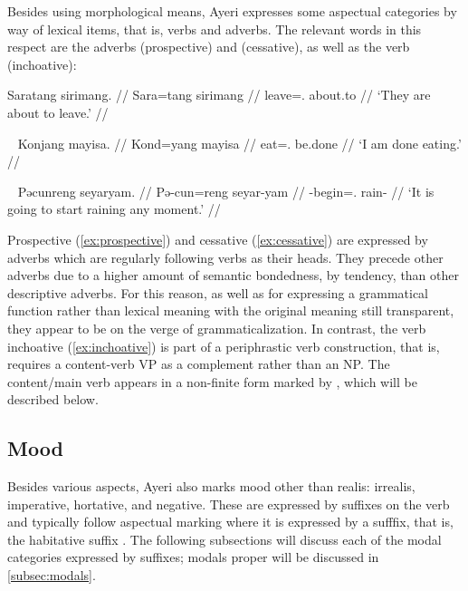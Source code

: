 Besides using morphological means, Ayeri expresses some aspectual categories by
way of lexical items, that is, verbs and adverbs. The relevant words in this
respect are the adverbs  (prospective) and
 (cessative), as well as 
the verb  (inchoative):

\ex\label{ex:prospective}\begingl
	\gla Saratang sirimang. //
	\glb Sara=tang sirimang //
	\glc leave=\TplM{}.\Aarg{} about.to //
	\glft `They are about to leave.' //
\endgl\xe

\ex~\label{ex:cessative}\begingl
	\gla Konjang mayisa. //
	\glb Kond=yang mayisa //
	\glc eat=\Fsg.\Aarg{} be.done //
	\glft `I am done eating.' //
\endgl\xe

\ex~\label{ex:inchoative}\begingl
	\gla Pəcunreng seyaryam. //
	\glb Pə-cun=reng seyar-yam //
	\glc \NFut{}-begin=\TsgI{}.\Aarg{} rain-\Ptcp{} //
	\glft `It is going to start raining any moment.' //
\endgl\xe

Prospective  (\ref{ex:prospective}) and cessative
 (\ref{ex:cessative}) are expressed by adverbs which are
regularly following verbs as their heads. They precede other adverbs due to a
higher amount of semantic bondedness, by tendency, than other descriptive
adverbs. For this reason, as well as for expressing a grammatical function rather
than lexical meaning with the original meaning still transparent, they appear
to be on the verge of grammaticalization. In contrast, the verb inchoative 
 (\ref{ex:inchoative}) is part of a periphrastic verb 
construction, that is,  requires a content-verb VP as a 
complement rather than an NP. The content/main verb appears in a non-finite 
form marked by , which will be described below.

\subsection{Mood}
\label{subsec:mood}

Besides various aspects, Ayeri also marks mood other than realis: irrealis,
imperative, hortative, and negative. These are expressed by suffixes on
the verb and typically follow aspectual marking where it is expressed by a
sufffix, that is, the habitative suffix . The following
subsections will discuss each of the modal categories expressed by suffixes;
modals proper will be discussed in \autoref{subsec:modals}.


